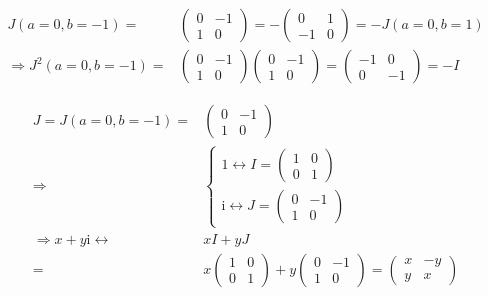 \documentclass[
]{book}
\theoremstyle{definition}
\theoremstyle{definition}
\theoremstyle{definition}
\theoremstyle{definition}
\theoremstyle{remark}
\begin{document}
\[
\begin{aligned}
J\left(a=0,b=-1\right)= & \begin{pmatrix}0 & -1\\
1 & 0
\end{pmatrix}=-\begin{pmatrix}0 & 1\\
-1 & 0
\end{pmatrix}=-J\left(a=0,b=1\right)\\
\Rightarrow J^{2}\left(a=0,b=-1\right)= & \begin{pmatrix}0 & -1\\
1 & 0
\end{pmatrix}\begin{pmatrix}0 & -1\\
1 & 0
\end{pmatrix}=\begin{pmatrix}-1 & 0\\
0 & -1
\end{pmatrix}=-I
\end{aligned}
\]

\[
\begin{aligned}
J=J\left(a=0,b=-1\right)= & \begin{pmatrix}0 & -1\\
1 & 0
\end{pmatrix}\\
\Rightarrow & \begin{cases}
1\leftrightarrow I=\begin{pmatrix}1 & 0\\
0 & 1
\end{pmatrix}\\
\mathrm{i}\leftrightarrow J=\begin{pmatrix}0 & -1\\
1 & 0
\end{pmatrix}
\end{cases}\\
\Rightarrow x+y\mathrm{i}\leftrightarrow & xI+yJ\\
= & x\begin{pmatrix}1 & 0\\
0 & 1
\end{pmatrix}+y\begin{pmatrix}0 & -1\\
1 & 0
\end{pmatrix}=\begin{pmatrix}x & -y\\
y & x
\end{pmatrix}
\end{aligned}
\]
\end{document}
